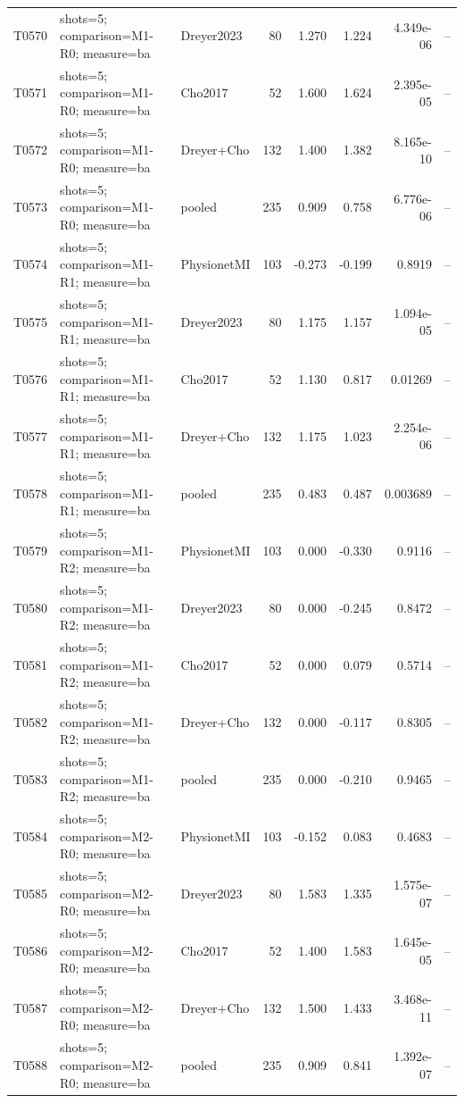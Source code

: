 \begin{longtable}{p{.45in}p{2.6in}p{.75in}rrrrr}
T0570 & shots=5; comparison=M1-R0; measure=ba & Dreyer2023 & 80 & 1.270 & 1.224 & 4.349e-06 & -- \\
T0571 & shots=5; comparison=M1-R0; measure=ba & Cho2017 & 52 & 1.600 & 1.624 & 2.395e-05 & -- \\
T0572 & shots=5; comparison=M1-R0; measure=ba & Dreyer+Cho & 132 & 1.400 & 1.382 & 8.165e-10 & -- \\
T0573 & shots=5; comparison=M1-R0; measure=ba & pooled & 235 & 0.909 & 0.758 & 6.776e-06 & -- \\
T0574 & shots=5; comparison=M1-R1; measure=ba & PhysionetMI & 103 & -0.273 & -0.199 & 0.8919 & -- \\
T0575 & shots=5; comparison=M1-R1; measure=ba & Dreyer2023 & 80 & 1.175 & 1.157 & 1.094e-05 & -- \\
T0576 & shots=5; comparison=M1-R1; measure=ba & Cho2017 & 52 & 1.130 & 0.817 & 0.01269 & -- \\
T0577 & shots=5; comparison=M1-R1; measure=ba & Dreyer+Cho & 132 & 1.175 & 1.023 & 2.254e-06 & -- \\
T0578 & shots=5; comparison=M1-R1; measure=ba & pooled & 235 & 0.483 & 0.487 & 0.003689 & -- \\
T0579 & shots=5; comparison=M1-R2; measure=ba & PhysionetMI & 103 & 0.000 & -0.330 & 0.9116 & -- \\
T0580 & shots=5; comparison=M1-R2; measure=ba & Dreyer2023 & 80 & 0.000 & -0.245 & 0.8472 & -- \\
T0581 & shots=5; comparison=M1-R2; measure=ba & Cho2017 & 52 & 0.000 & 0.079 & 0.5714 & -- \\
T0582 & shots=5; comparison=M1-R2; measure=ba & Dreyer+Cho & 132 & 0.000 & -0.117 & 0.8305 & -- \\
T0583 & shots=5; comparison=M1-R2; measure=ba & pooled & 235 & 0.000 & -0.210 & 0.9465 & -- \\
T0584 & shots=5; comparison=M2-R0; measure=ba & PhysionetMI & 103 & -0.152 & 0.083 & 0.4683 & -- \\
T0585 & shots=5; comparison=M2-R0; measure=ba & Dreyer2023 & 80 & 1.583 & 1.335 & 1.575e-07 & -- \\
T0586 & shots=5; comparison=M2-R0; measure=ba & Cho2017 & 52 & 1.400 & 1.583 & 1.645e-05 & -- \\
T0587 & shots=5; comparison=M2-R0; measure=ba & Dreyer+Cho & 132 & 1.500 & 1.433 & 3.468e-11 & -- \\
T0588 & shots=5; comparison=M2-R0; measure=ba & pooled & 235 & 0.909 & 0.841 & 1.392e-07 & -- \\

\end{longtable}
